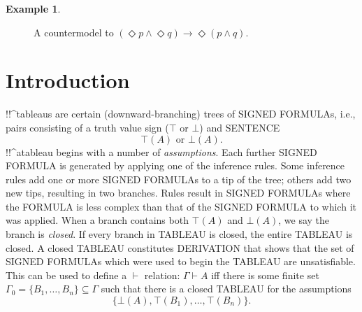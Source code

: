 \documentclass[10pt,a4paper]{article}
\newcommand*{\olup}[1]{\MakeUppercase{#1}}
\theoremstyle{plain}
\theoremstyle{definition}
\newtheorem{ex}[thm]{Example}
\theoremstyle{remark}
\newcommand*{\olfileid}[3]{}
\newcommand*{\olsection}[1]{\section*{#1}}
\newcommand*{\ollabel}[1]{\label{#1}}
\providecommand{\lif}{\mathbin{\rightarrow}}
\providecommand{\Proves}{\mathrel{\vdash}}
\providecommand{\sFmla}[2]{#1(#2)}
\providecommand{\True}{\top}
\providecommand{\False}{\bot}
\begin{document}
{\begin{ex}
\begin{figure}
\begin{center}
  \end{center}
  \caption{A countermodel to $(\Diamond p \land \Diamond q) \lif
    \Diamond (p \land q)$.}
  \ollabel{fig:counter-Diamond}
\end{figure}
\end{ex}          
}





\olfileid{nml}{tab}{int}

\olsection{Introduction}

!!^{tableau}s are certain (downward-branching) trees of \olup{signed
  formula}s, i.e., pairs consisting of a truth value sign ($\True$ or
$\False$) and \olup{sentence}
\[
\sFmla{\True}{A} \text{ or } \sFmla{\False}{A}.
\]
!!^a{tableau} begins with a number of \emph{assumptions}. Each further
\olup{signed formula} is generated by applying one of the inference
rules. Some inference rules add one or more \olup{signed formula}s to a
tip of the tree; others add two new tips, resulting in two branches.
Rules result in \olup{signed formula}s where the \olup{formula} is
less complex than that of the \olup{signed formula} to which it was
applied. When a branch contains both $\sFmla{\True}{A}$ and
$\sFmla{\False}{A}$, we say the branch is \emph{closed}. If every
branch in \olup{tableau} is closed, the entire \olup{tableau} is closed. A
closed \olup{tableau} constitutes \olup{derivation} that shows that the set
of \olup{signed formula}s which were used to begin the \olup{tableau} are
unsatisfiable.  This can be used to define a $\Proves$ relation:
$\Gamma \Proves A$ iff there is some finite set~$\Gamma_0 = \{B_1,
\dots, B_n\} \subseteq \Gamma$ such that there is a closed
\olup{tableau} for the assumptions
\[
\{\sFmla{\False}{A}, \sFmla{\True}{B_1}, \dots, \sFmla{\True}{B_n}\}.
\]
\end{document}
